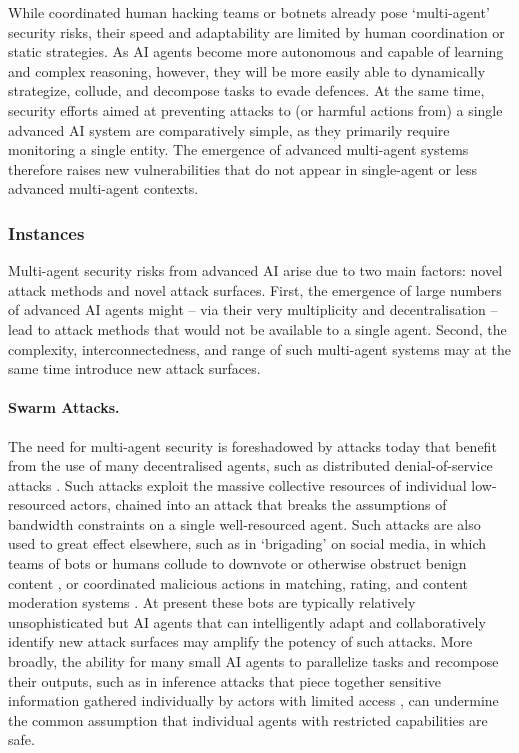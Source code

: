 While coordinated human hacking teams or botnets already pose `multi-agent' security risks, their speed and adaptability are limited by human coordination or static strategies.
As AI agents become more autonomous and capable of learning and complex reasoning, however, they will be more easily able to dynamically strategize, collude, and decompose tasks to evade defences.
At the same time, security efforts aimed at preventing attacks to (or harmful actions from) a single advanced AI system are comparatively simple, as they primarily require monitoring a single entity.
The emergence of advanced multi-agent systems therefore raises new vulnerabilities that do not appear in single-agent or less advanced multi-agent contexts.



\subsubsection{Instances}

Multi-agent security risks from advanced AI arise due to two main factors: novel attack methods and novel attack surfaces.
First, the emergence of large numbers of advanced AI agents might -- via their very multiplicity and decentralisation -- lead to attack methods that would not be available to a single agent.
Second, the complexity, interconnectedness, and range of such multi-agent systems may at the same time introduce new attack surfaces.


\paragraph{Swarm Attacks.}
The need for multi-agent security is foreshadowed by attacks today that benefit from the use of many decentralised agents, such as distributed denial-of-service attacks \citep{cisco_what_2023,DDoSThreatReport2024Q3}.
Such attacks exploit the massive collective resources of individual low-resourced actors, chained into an attack that breaks the assumptions of bandwidth constraints on a single well-resourced agent.
Such attacks are also used to great effect elsewhere, such as in `brigading' on social media, in which teams of bots or humans collude to downvote or otherwise obstruct benign content \citep{blair_institute_social_2021}, or coordinated malicious actions in matching, rating, and content moderation systems \citep{Newman2024,Sharma2025}.
At present these bots are typically relatively unsophisticated but AI agents that can intelligently adapt and collaboratively identify new attack surfaces may amplify the potency of such attacks.
More broadly, the ability for many small AI agents to parallelize tasks and recompose their outputs, such as in inference attacks that piece together sensitive information gathered individually by actors with limited access \citep{DBLP:conf/ndss/IslamKK12}, can undermine the common assumption that individual agents with restricted capabilities are safe.

